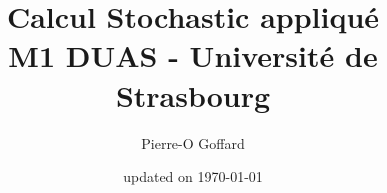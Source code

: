 \documentclass[a4paper]{report}
\begin{document}
\title{Calcul Stochastic appliqué\\
[0.2em]\smaller{}M1 DUAS - Université de Strasbourg}
\author{Pierre-O Goffard}

\date{updated on \today} 
\maketitle
\tableofcontents








% 
% 
% 
% 
% 



\end{document}
